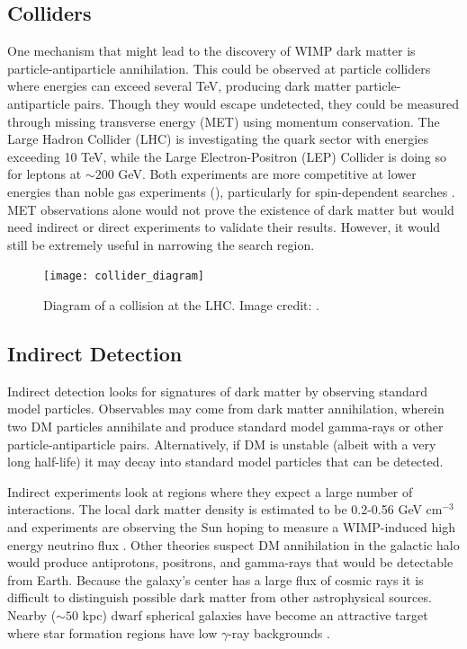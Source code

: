 \subsection{Colliders} \label{subsec:colliders}
One mechanism that might lead to the discovery of WIMP dark matter is particle-antiparticle
annihilation.  This could be observed at particle colliders where energies can exceed
several TeV, producing dark matter particle-antiparticle pairs.  Though they would escape undetected, they could be measured through
missing transverse energy (MET) using momentum conservation.  The
Large Hadron Collider (LHC) is investigating the quark sector with energies
exceeding 10 TeV, while the Large Electron-Positron (LEP) Collider is doing so for leptons at
${\sim} 200$ GeV.  Both experiments are more competitive at lower energies than noble gas experiments (),
particularly for spin-dependent searches .  MET observations alone would not prove the existence of dark
matter but would need
indirect or direct experiments to validate their results.  However, it would still be extremely useful in narrowing the search region.

\begin{figure}
\centering
\texttt{[image: collider\_diagram]}
\caption{Diagram of a collision at the LHC.  Image credit: .}
\label{fig:collider}
\end{figure}


\subsection{Indirect Detection} \label{subsec:indirect}
Indirect detection looks for signatures of dark matter by observing standard model particles.  Observables
may come from dark matter annihilation, wherein two DM particles annihilate and produce standard model
gamma-rays or other particle-antiparticle pairs.  Alternatively, if DM is unstable (albeit with a very long half-life) it may decay into
standard model particles that can be detected.

Indirect experiments look at regions where they expect a large number of interactions.  The local
dark matter density is estimated to be 0.2-0.56 GeV cm$^{-3}$  and experiments are observing
the Sun hoping to measure a WIMP-induced high energy neutrino flux .  Other theories suspect
DM annihilation in the galactic halo would produce
antiprotons, positrons, and gamma-rays that would be detectable from Earth.  Because the galaxy's center
has a large flux of cosmic rays it is difficult to distinguish possible dark matter from other astrophysical
sources.  Nearby (${\sim} 50$ kpc) dwarf spherical
galaxies have become an attractive target where star formation regions have low $\gamma$-ray backgrounds .

